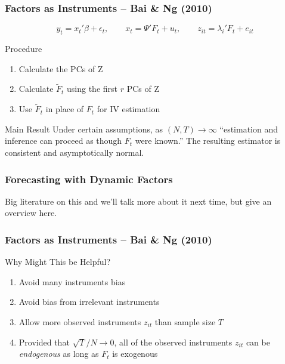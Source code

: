 \documentclass[handout]{beamer}
\begin{document}
\begin{frame}[c]\frametitle{Factors as Instruments -- Bai \& Ng (2010)}

\small

$$\boxed{
	y_t = x_t' \beta + \epsilon_t, \quad \quad
	x_t = \Psi'F_t + u_t, \quad \quad
	z_{it} = \lambda_i' F_t + e_{it}
}$$
\vspace{1em}

\begin{block}
	{Procedure}
	\begin{enumerate}
		\item Calculate the PCs of Z
		\item Calculate $\widetilde{F}_t$ using the first $r$ PCs of Z
		\item Use $\widetilde{F}_t$ in place of $F_t$ for IV estimation
	\end{enumerate}
\end{block}

\begin{block}
	{Main Result}
	Under certain assumptions, as $(N,T) \rightarrow \infty$ ``estimation and inference can proceed as though $F_t$ were known.'' The resulting estimator is consistent and asymptotically normal.
\end{block}

\normalsize

\end{frame}
\begin{frame}[c]\frametitle{Forecasting with Dynamic Factors}
    
Big literature on this and we'll talk more about it next time, but give an overview here.

\end{frame}
\begin{frame}[c]\frametitle{Factors as Instruments -- Bai \& Ng (2010)}
    
\begin{block}
	{Why Might This be Helpful?}
	\begin{enumerate}
		\item Avoid many instruments bias
		\item Avoid bias from irrelevant instruments
		\item Allow more observed instruments $z_{it}$ than sample size $T$
		\item Provided that $\sqrt{T}/N \rightarrow 0$, all of the observed instruments $z_{it}$ can be \emph{endogenous} as long as $F_t$ is exogenous
	\end{enumerate}
\end{block}

\end{frame}
\end{document}
